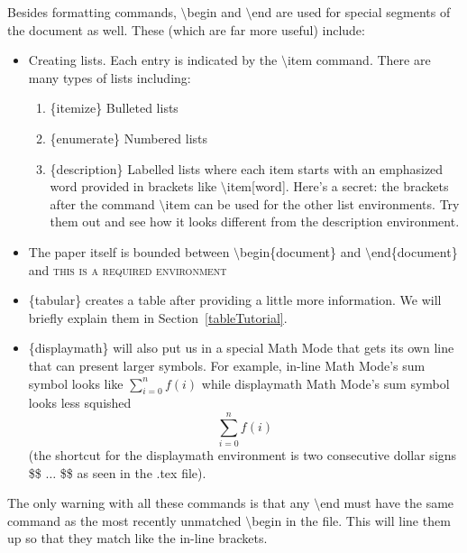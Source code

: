 \documentclass[10pt]{article}
\begin{document}
Besides formatting commands, $ \setminus $begin and $ \setminus $end are used for special segments of the document as well.  These (which are far more useful) include:
\begin{itemize}
\item Creating lists.  Each entry is indicated by the $ \setminus $item command.  There are many types of lists including:
\begin{enumerate}
\item \{itemize\} Bulleted lists
\item \{enumerate\} Numbered lists
\item \{description\} Labelled lists where each item starts with an emphasized word provided in brackets like $ \setminus $item[word].  Here's a secret: the brackets after the command $ \setminus $item can be used for the other list environments.  Try them out and see how it looks different from the description environment.
\end{enumerate}
\item The paper itself is bounded between $ \setminus $begin\{document\} and $ \setminus $end\{document\} and \textsc{this is a required environment}
\item \{tabular\} creates a table after providing a little more information.  We will briefly explain them in Section~\ref{tableTutorial}.
\item \{displaymath\} will also put us in a special Math Mode that gets its own line that can present larger symbols.  For example, in-line Math Mode's sum symbol looks like $ \sum_{i = 0}^{n} f\left(i\right) $ while displaymath Math Mode's sum symbol looks less squished $$ \sum_{i = 0}^{n} f\left(i\right) $$ (the shortcut for the displaymath environment is two consecutive dollar signs \$\$ $\ldots$ \$\$ as seen in the .tex file).
\end{itemize}
The only warning with all these commands is that any $ \setminus $end must have the same command as the most recently unmatched $ \setminus $begin in the file.  This will line them up so that they match like the in-line brackets.
\end{document}
